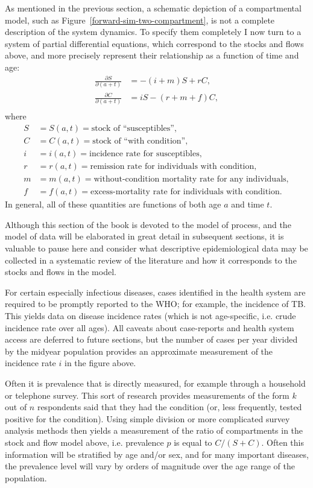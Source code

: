 As mentioned in the previous section, a schematic depiction of a
compartmental model, such as Figure~\ref{forward-sim-two-compartment},
is not a complete description of the system dynamics.  To specify them
completely I now turn to a system of partial differential equations,
which correspond to the stocks and flows above, and more precisely
represent their relationship as a function of time and age:
\begin{align*}
\frac{\partial S}{\partial (a+t)} &= -(i + m)S + rC,\\
\frac{\partial C}{\partial (a+t)} &= iS - (r + m + f)C,\\
\end{align*}
where
\begin{align*}
S &= S(a,t) = \text{stock of ``susceptibles''},\\
C &= C(a,t) = \text{stock of ``with condition''},\\[.1in]
i &= i(a,t) = \text{incidence rate for susceptibles},\\
r &= r(a,t) = \text{remission rate for individuals with condition},\\
m &= m(a,t) = \text{without-condition mortality rate for any individuals},\\
f &= f(a,t) = \text{excess-mortality rate for individuals with
condition}.
\end{align*}
In general, all of these quantities are functions of both age $a$ and
time $t$.

Although this section of the book is devoted to the model of process,
and the model of data will be elaborated in great detail in subsequent
sections, it is valuable to pause here and consider what descriptive
epidemiological data may be collected in a systematic review of the
literature and how it corresponds to the stocks and flows in the
model.

For certain especially infectious diseases, cases identified in the
health system are required to be promptly reported to the WHO; for
example, the incidence of TB.  This yields data on disease incidence
rates (which is not age-specific, i.e. crude incidence rate over all
ages).  All caveats about case-reports and health system access are
deferred to future sections, but the number of cases per year divided
by the midyear population provides an approximate measurement of the
incidence rate $i$ in the figure above.

Often it is prevalence that is directly measured, for example through
a household or telephone survey.  This sort of research provides
measurements of the form $k$ out of $n$ respondents said that they had
the condition (or, less frequently, tested positive for the
condition). Using simple division or more complicated survey analysis
methods then yields a measurement of the ratio of compartments in the
stock and flow model above, i.e. prevalence $p$ is equal to $C/(S+C)$.
Often this information will be stratified by age and/or sex, and for
many important diseases, the prevalence level will vary by orders of
magnitude over the age range of the population.

